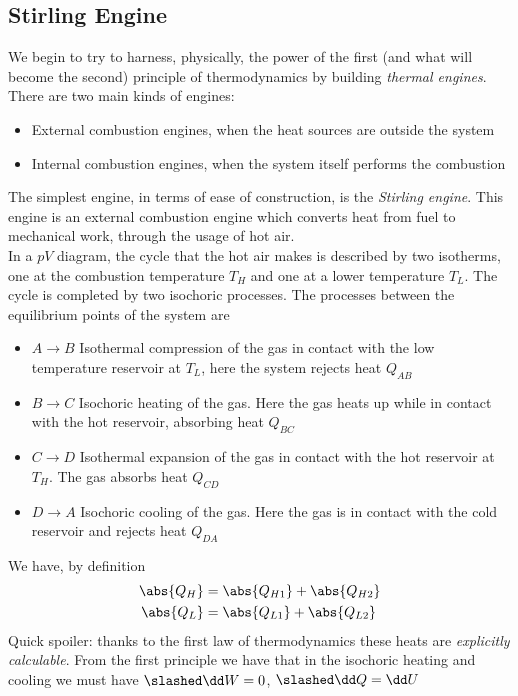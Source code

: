 \documentclass[../qm.tex]{subfiles}
\begin{document}
\subsection{Stirling Engine}
We begin to try to harness, physically, the power of the first (and what will become the second) principle of thermodynamics by building \textit{thermal engines}. There are two main kinds of engines:
\begin{itemize}
\item External combustion engines, when the heat sources are outside the system
\item Internal combustion engines, when the system itself performs the combustion
\end{itemize}
The simplest engine, in terms of ease of construction, is the \emph{Stirling engine}. This engine is an external combustion engine which converts heat from fuel to mechanical work, through the usage of hot air.\\
In a $pV$ diagram, the cycle that the hot air makes is described by two isotherms, one at the combustion temperature $T_H$ and one at a lower temperature $T_L$. The cycle is completed by two isochoric processes.
The processes between the equilibrium points of the system are
\begin{itemize}
\item $A\to B$ Isothermal compression of the gas in contact with the low temperature reservoir at $T_L$, here the system rejects heat $Q_{AB}$
\item $B\to C$ Isochoric heating of the gas. Here the gas heats up while in contact with the hot reservoir, absorbing heat $Q_{BC}$
\item $C\to D$ Isothermal expansion of the gas in contact with the hot reservoir at $T_H$. The gas absorbs heat $Q_{CD}$
\item $D\to A$ Isochoric cooling of the gas. Here the gas is in contact with the cold reservoir and rejects heat $Q_{DA}$
\end{itemize}
We have, by definition 
\begin{equation}
	\begin{aligned}
		\abs{Q_H}&= \abs{Q_{H1}}+\abs{Q_{H2}}\\
		\abs{Q_L}&= \abs{Q_{L1}}+\abs{Q_{L2}}
	\end{aligned}
	\label{eq:heatsstr.eng}
\end{equation}
Quick spoiler: thanks to the first law of thermodynamics these heats are \textit{explicitly calculable}. From the first principle we have that in the isochoric heating and cooling we must have $\slashed\dd W=0$, $\slashed\dd Q=\dd U$
\end{document}

